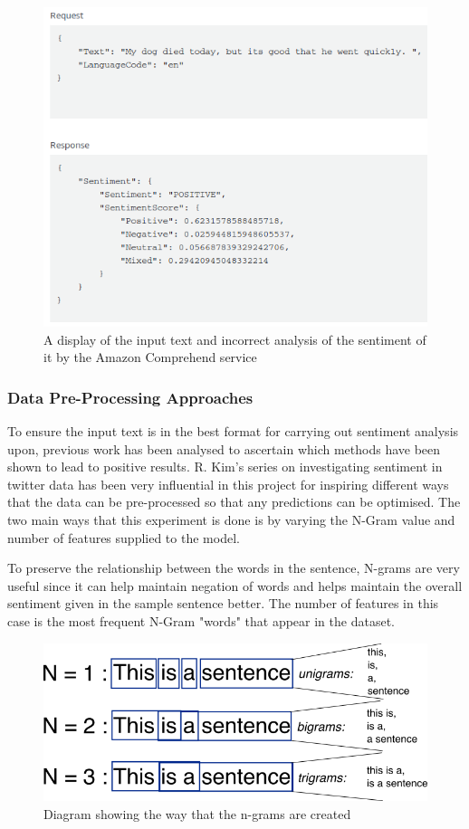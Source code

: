 \begin{figure}[ht]
\centering
\includegraphics[scale=0.5]{litImgs/comphrendResult.png}
\caption{A display of the input text and incorrect analysis of the sentiment of it by the Amazon Comprehend service}
\label{aws:sentiment}
\end{figure}

\subsubsection{Data Pre-Processing Approaches}

To ensure the input text is in the best format for carrying out sentiment analysis upon, previous work has been analysed to ascertain which methods have been shown to lead to positive results.
R. Kim's series on investigating sentiment in twitter data \cite{towardsDS} has been very influential in this project for inspiring different ways that the data can be pre-processed so that any predictions can be optimised.
The two main ways that this experiment is done is by varying the N-Gram value and number of features supplied to the model.

To preserve the relationship between the words in the sentence, N-grams are very useful since it can help maintain negation of words and helps maintain the overall sentiment given in the sample sentence better. The number of features in this case is the most frequent N-Gram "words" that appear in the dataset.

\begin{figure}[h]
\centering
\includegraphics[scale=0.5]{litImgs/ngrams.png}
\caption{Diagram showing the way that the n-grams are created}
\end{figure}


